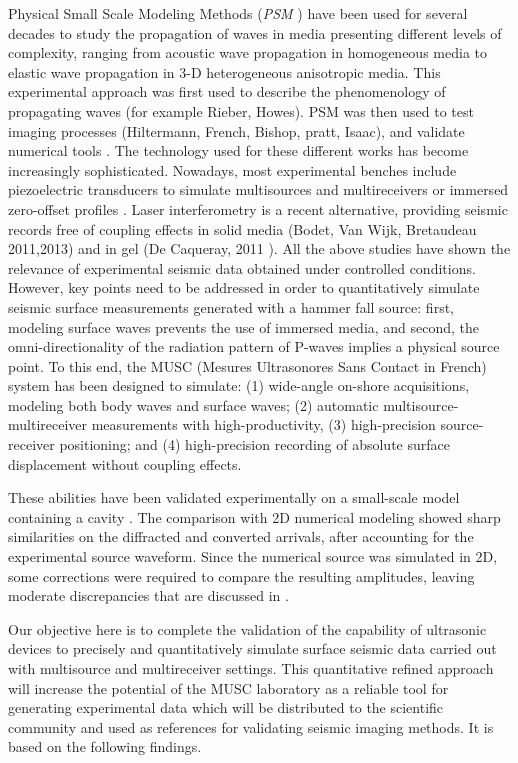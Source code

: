 \documentclass[manuscript,revised]{geophysics}
\newcommand{\psm}{\textit{PSM} }
\newcommand{\thrd}{3-D }
\begin{document}
\noindent Physical Small Scale Modeling Methods (\psm) have been used for several decades to study the propagation of waves in media presenting different levels of complexity, ranging from acoustic wave propagation in homogeneous media to elastic wave propagation in \thrd heterogeneous anisotropic media. This experimental approach was first used to describe the phenomenology of propagating waves (for example Rieber, Howes). PSM was then used to test imaging processes (Hiltermann, French, Bishop, pratt, Isaac), and validate numerical tools \citep{Favretto_NMT_2013}. The technology used for these different works has become increasingly sophisticated. Nowadays, most experimental benches include piezoelectric transducers to simulate multisources and multireceivers \citep{Wong_SPM_2009} or immersed zero-offset profiles \citep{Favretto_NMT_2013}. Laser interferometry is a recent alternative, providing seismic records free of coupling effects in solid media (Bodet, Van Wijk, Bretaudeau 2011,2013) and in gel (De Caqueray, 2011 ). All the above studies have shown the relevance of experimental seismic data obtained under controlled conditions. However, key points need to be addressed in order to quantitatively simulate seismic surface measurements generated with a hammer fall source: first, modeling surface waves prevents the use of immersed media, and second, the omni-directionality of the radiation pattern of P-waves implies a physical source point. To this end, the MUSC (Mesures Ultrasonores Sans Contact in French) system has been designed \citep{Bretaudeau_SSM_2011} to simulate: (1) wide-angle on-shore acquisitions, modeling both body waves and surface waves; (2) automatic multisource-multireceiver measurements with high-productivity, (3) high-precision source-receiver positioning; and (4) high-precision recording of absolute surface displacement without coupling effects. 

\noindent These abilities have been validated experimentally on a small-scale model containing a cavity \citep{Bretaudeau_SSM_2011}. The comparison with 2D numerical modeling showed sharp similarities on the diffracted and converted arrivals, after accounting for the experimental source waveform. Since the numerical source was simulated in 2D, some corrections were required to compare the resulting amplitudes, leaving moderate discrepancies that are discussed in \citet{Bretaudeau_SSM_2011}. 

\noindent Our objective here is to complete the validation of the capability of ultrasonic devices to precisely and quantitatively simulate surface seismic data carried out with multisource and multireceiver settings. This quantitative refined approach will increase the potential of the MUSC laboratory as a reliable tool for generating experimental data which will be distributed to the scientific community and used as references for validating seismic imaging methods. It is based on the following findings.
\end{document}
